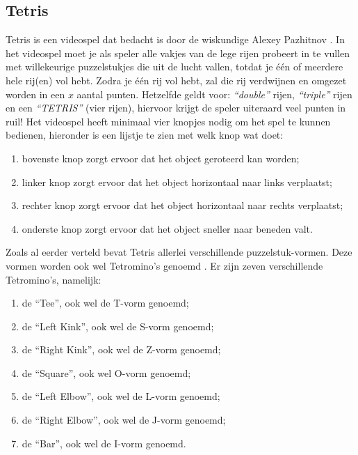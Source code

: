 

 

\subsection{Tetris}
Tetris is een videospel dat bedacht is door de wiskundige Alexey Pazhitnov \cite{Brzustowski_1992}. In het videospel moet je als speler alle vakjes van de lege rijen probeert in te vullen met willekeurige puzzelstukjes die uit de lucht vallen, totdat je één of meerdere hele rij(en) vol hebt. 
Zodra je één rij vol hebt, zal die rij verdwijnen en omgezet worden in een \(x\) aantal punten. Hetzelfde geldt voor: \textit{``double''} rijen, \textit{``triple''} rijen en een \textit{``TETRIS''} (vier rijen), hiervoor krijgt de speler uiteraard veel punten in ruil!
Het videospel heeft minimaal vier knopjes nodig om het spel te kunnen bedienen, hieronder is een lijstje te zien met welk knop wat doet:
\begin{enumerate}
    \item bovenste knop zorgt ervoor dat het object geroteerd kan worden;
    \item linker knop zorgt ervoor dat het object horizontaal naar links verplaatst;
    \item rechter knop zorgt ervoor dat het object horizontaal naar rechts verplaatst;
    \item onderste knop zorgt ervoor dat het object sneller naar beneden valt.
\end{enumerate}
Zoals al eerder verteld bevat Tetris allerlei verschillende puzzelstuk-vormen. Deze vormen worden ook wel Tetromino's genoemd \cite{Burgiel1997}. 
Er zijn zeven verschillende Tetromino's, namelijk:
\begin{enumerate}
    \item de ``Tee'', ook wel de T-vorm genoemd;
    \item de ``Left Kink'', ook wel de S-vorm genoemd;
    \item de ``Right Kink'', ook wel de Z-vorm genoemd;
    \item de ``Square'', ook wel O-vorm genoemd;
    \item de ``Left Elbow'', ook wel de L-vorm genoemd;
    \item de ``Right Elbow'', ook wel de J-vorm genoemd;
    \item de ``Bar'', ook wel de I-vorm genoemd.
\end{enumerate}
